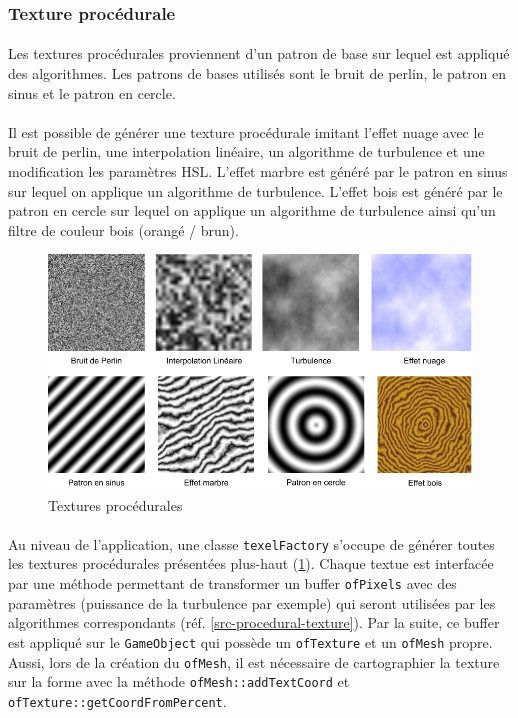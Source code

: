 \subsubsection{Texture procédurale}
\paragraph{} Les textures procédurales proviennent d'un patron de base sur lequel est appliqué des algorithmes. Les patrons de bases utilisés sont le bruit de perlin, le patron en sinus et le patron en cercle.
\paragraph{} Il est possible de générer une texture procédurale imitant l'effet nuage avec le bruit de perlin, une interpolation linéaire, un algorithme de turbulence et une modification les paramètres HSL. L'effet marbre est généré par le patron en sinus sur lequel on applique un algorithme de turbulence. L'effet bois est généré par le patron en cercle sur lequel on applique un algorithme de turbulence ainsi qu'un filtre de couleur bois (orangé / brun).
\begin{figure}[H]
\centering
\includegraphics[width=\textwidth]{img/infog-image-procedural-texture.png}
\caption{Textures procédurales}\label{fig-procedural-texture}
\end{figure}
\paragraph{} Au niveau de l'application, une classe \texttt{texelFactory} s'occupe de générer toutes les textures procédurales présentées plus-haut (\ref{fig-procedural-texture}).  Chaque textue est interfacée par une méthode permettant de transformer un buffer \texttt{ofPixels} avec des paramètres (puissance de la turbulence par exemple) qui seront utilisées par les algorithmes correspondants (réf. \ref{src-procedural-texture}). Par la suite, ce buffer est appliqué sur le \texttt{GameObject} qui possède un \texttt{ofTexture} et un \texttt{ofMesh} propre. Aussi, lors de la création du \texttt{ofMesh}, il est nécessaire de cartographier la texture sur la forme avec la méthode \texttt{ofMesh::addTextCoord} et \texttt{ofTexture::getCoordFromPercent}.

